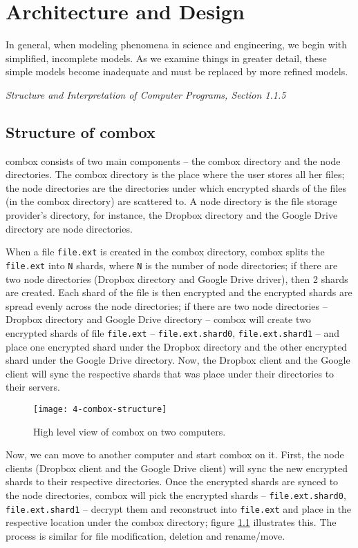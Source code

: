 \chapter{Architecture and Design}

\epigraph{In general, when modeling phenomena in science and
  engineering, we begin with simplified, incomplete models. As we
  examine things in greater detail, these simple models become
  inadequate and must be replaced by more refined
  models.}{\textit{Structure and Interpretation of Computer Programs,
    Section 1.1.5}\cite{sicp}}

\section{Structure of combox}

combox consists of two main components -- the combox directory and the
node directories. The combox directory is the place where the user
stores all her files; the node directories are the directories under
which encrypted shards of the files (in the combox directory) are
scattered to. A node directory is the file storage provider's
directory, for instance, the Dropbox directory and the Google Drive
directory are node directories.

When a file \verb+file.ext+ is created in the combox directory, combox
splits the \verb+file.ext+ into \verb+N+ shards, where \verb+N+ is the
number of node directories; if there are two node directories (Dropbox
directory and Google Drive driver), then 2 shards are created. Each
shard of the file is then encrypted and the encrypted shards are
spread evenly across the node directories; if there are two node
directories -- Dropbox directory and Google Drive directory -- combox
will create two encrypted shards of file \verb+file.ext+ --
\verb+file.ext.shard0+, \verb+file.ext.shard1+ -- and place one
encrypted shard under the Dropbox directory and the other encrypted
shard under the Google Drive directory. Now, the Dropbox client and
the Google client will sync the respective shards that was place under
their directories to their servers.

\begin{figure}[h]
\texttt{[image: 4-combox-structure]}
\caption{High level view of combox on two computers.}
\label{fig:4-combox-structure}
\end{figure}

Now, we can move to another computer and start combox on it. First,
the node clients (Dropbox client and the Google Drive client) will
sync the new encrypted shards to their respective directories. Once
the encrypted shards are synced to the node directories, combox will
pick the encrypted shards -- \verb+file.ext.shard0+,
\verb+file.ext.shard1+ -- decrypt them and reconstruct into
\verb+file.ext+ and place in the respective location under the combox
directory; figure \ref{fig:4-combox-structure} illustrates this. The
process is similar for file modification, deletion and rename/move.

